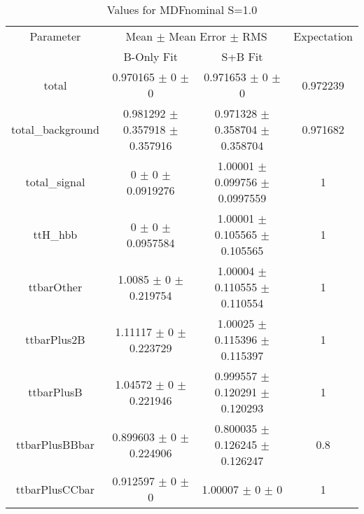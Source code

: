 \begin{table}
\centering
\caption{Values for MDFnominal S=1.0}
\begin{tabular}{cccc}
\toprule
Parameter & \multicolumn{2}{c}{Mean $\pm$ Mean Error $\pm$ RMS} & Expectation\\
 & B-Only Fit & S+B Fit & \\
\midrule
total & \num{0.970165} $\pm$ \num{0} $\pm$ \num{0} & \num{0.971653} $\pm$ \num{0} $\pm$ \num{0} & \num{0.972239}\\
total\_background & \num{0.981292} $\pm$ \num{0.357918} $\pm$ \num{0.357916} & \num{0.971328} $\pm$ \num{0.358704} $\pm$ \num{0.358704} & \num{0.971682}\\
total\_signal & \num{0} $\pm$ \num{0} $\pm$ \num{0.0919276} & \num{1.00001} $\pm$ \num{0.099756} $\pm$ \num{0.0997559} & \num{1}\\
ttH\_hbb & \num{0} $\pm$ \num{0} $\pm$ \num{0.0957584} & \num{1.00001} $\pm$ \num{0.105565} $\pm$ \num{0.105565} & \num{1}\\
ttbarOther & \num{1.0085} $\pm$ \num{0} $\pm$ \num{0.219754} & \num{1.00004} $\pm$ \num{0.110555} $\pm$ \num{0.110554} & \num{1}\\
ttbarPlus2B & \num{1.11117} $\pm$ \num{0} $\pm$ \num{0.223729} & \num{1.00025} $\pm$ \num{0.115396} $\pm$ \num{0.115397} & \num{1}\\
ttbarPlusB & \num{1.04572} $\pm$ \num{0} $\pm$ \num{0.221946} & \num{0.999557} $\pm$ \num{0.120291} $\pm$ \num{0.120293} & \num{1}\\
ttbarPlusBBbar & \num{0.899603} $\pm$ \num{0} $\pm$ \num{0.224906} & \num{0.800035} $\pm$ \num{0.126245} $\pm$ \num{0.126247} & \num{0.8}\\
ttbarPlusCCbar & \num{0.912597} $\pm$ \num{0} $\pm$ \num{0} & \num{1.00007} $\pm$ \num{0} $\pm$ \num{0} & \num{1}\\
\bottomrule
\end{tabular}
\end{table}